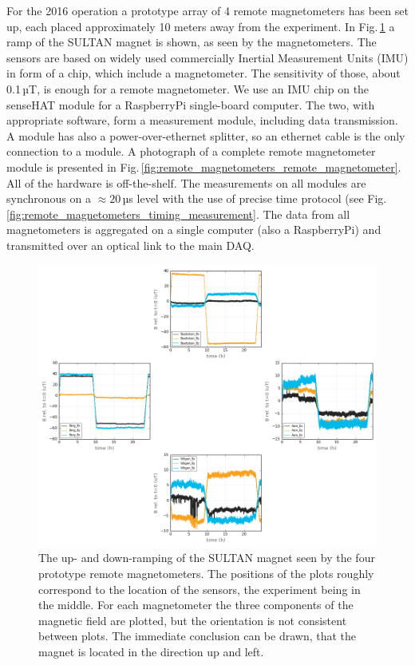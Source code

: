For the 2016 operation a prototype array of 4 remote magnetometers has been set up, each placed approximately 10 meters away from the experiment. In Fig.\,\ref{fig:remote_magnetometers_ui} a ramp of the SULTAN magnet is shown, as seen by the magnetometers. The sensors are based on widely used commercially Inertial Measurement Units (IMU) in form of a chip, which include a magnetometer. The sensitivity of those, about 0.1$\,$µT, is enough for a remote magnetometer. We use an IMU chip on the senseHAT module for a RaspberryPi single-board computer. The two, with appropriate software, form a measurement module, including data transmission. A module has also a power-over-ethernet splitter, so an ethernet cable is the only connection to a module. A photograph of a complete remote magnetometer module is presented in Fig.\,\ref{fig:remote_magnetometers_remote_magnetometer}. All of the hardware is off-the-shelf. The measurements on all modules are synchronous on a $\approx20\,$µs level with the use of precise time protocol (see Fig.\,\ref{fig:remote_magnetometers_timing_measurement}. The data from all magnetometers is aggregated on a single computer (also a RaspberryPi) and transmitted over an optical link to the main DAQ.

\begin{figure}
  \centering
  \includegraphics[width=\linewidth]{gfx/nEDM_SFC/ui_plot.png}
  \caption{The up- and down-ramping of the SULTAN magnet seen by the four prototype remote magnetometers. The positions of the plots roughly correspond to the location of the sensors, the experiment being in the middle. For each magnetometer the three components of the magnetic field are plotted, but the orientation is not consistent between plots. The immediate conclusion can be drawn, that the magnet is located in the direction up and left.}
  \label{fig:remote_magnetometers_ui}
\end{figure}

